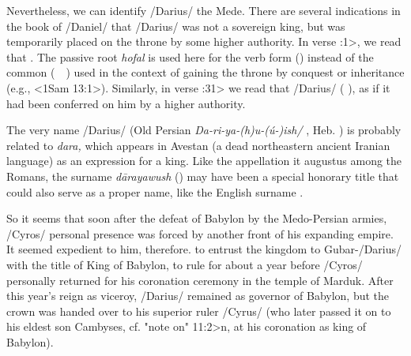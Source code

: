 Nevertheless, we can identify \x/Darius/ the Mede.
There are several indications in the book of \x/Daniel/ that \x/Darius/ was not a sovereign king, but was temporarily placed on the throne by some higher authority.
In verse :1>, we read that . The passive root {{\it hofal\/}} is used here for the verb form  (\Homlak) instead of the common  (\Malak \ \ ) used in the context of gaining the throne by conquest or inheritance (e.g., <1Sam 13:1>).
Similarly, in verse :31> we read that \x/Darius/  ( \Qabbel), as if it had been conferred on him by a higher authority.

The very name \x/Darius/ (Old Persian {\it Da-ri-ya-(h)u-(ú-)ish/} \Dariahuuish, Heb. \Dariawush) is probably related to {\it dara,\/} which appears in Avestan (a dead northeastern ancient Iranian language) as an expression for a king.
Like the appellation {{it augustus}} among the Romans, the surname {{\it dārayawush\/}} () may have been a special honorary title that
could also serve as a proper name, like the English surname .

%
%
So it seems that soon after the defeat of Babylon by the Medo-Persian armies, \x/Cyros/ personal presence was forced by another front of his expanding empire. It seemed expedient to him, therefore.
to entrust the kingdom to Gubar-\x/Darius/ with the title of King of Babylon, to rule for about a year before \x/Cyros/ personally returned for his coronation ceremony in the temple of Marduk.
After this year's reign as viceroy, \x/Darius/ remained as governor of Babylon, but the crown was handed over to his superior ruler \x/Cyrus/ (who later passed it on to his eldest son Cambyses, cf. \<"note on" 11:2>n, at his coronation as king of Babylon).

